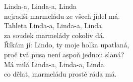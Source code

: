  

\nv{}Linda-a, Linda-a, Linda\\
nejradši marmeládu ze všech jídel má. \nc{}\\
Tahleta Linda-a, Linda-a, Linda\\
za soudek marmelády cokoliv dá.\\
Říkám jí: Lindo, ty moje holka upatlaná,\\
proč tvá pusa není aspoň jednou slaná?\\
Má milá Linda-a, Linda-a, Linda\\
co dělat, marmeládu prostě ráda má. \nc{}
\newpage
